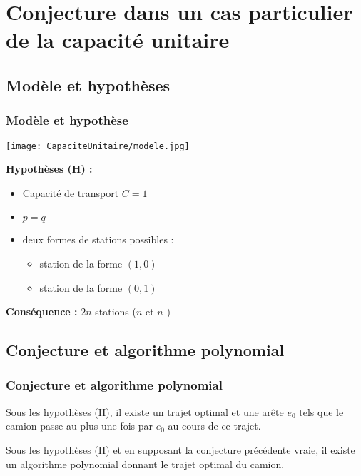 \section{Conjecture dans un cas particulier de la capacité unitaire}

\subsection{Modèle et hypothèses}

\begin{frame}[label=CapaciteUnitaire]
  \frametitle{Modèle et hypothèse}
  
  \begin{center}
  
    \begin{minipage}[c]{.5\linewidth}
      \begin{center}
        \texttt{[image: CapaciteUnitaire/modele.jpg]}
      \end{center}
    \end{minipage}\hfill
    \begin{minipage}[c]{.5\linewidth}
      \textbf{Hypothèses (H) :}
      \begin{itemize}
      \item Capacité de transport $C=1$
      \item $p=q$
      \item deux formes de stations possibles :
        \begin{itemize}
        \item station \plus de la forme $(1,0)$
        \item station \moins de la forme $(0,1)$
        \end{itemize}
      \end{itemize}
    \end{minipage}
  \end{center}
  \vfill
  \textbf{Conséquence :} $2n$ stations ($n$ \plus et $n$ \moins)
\end{frame}

\subsection{Conjecture et algorithme polynomial}

\begin{frame}
\frametitle{Conjecture et algorithme polynomial}

{
  \begin{conj} \label{conj: capacité unitaire - un passage}
  Sous les hypothèses (H), il existe un trajet optimal et une arête $e_0$ tels que le camion passe au plus une fois par $e_0$ au cours de ce trajet.
  \end{conj}
}
{
  \begin{thm} \label{thm: capacité unitaire - optimalité}
  Sous les hypothèses (H) et en supposant la conjecture précédente vraie, il existe un algorithme polynomial donnant le trajet optimal du camion.
  \end{thm}
}
\end{frame}

